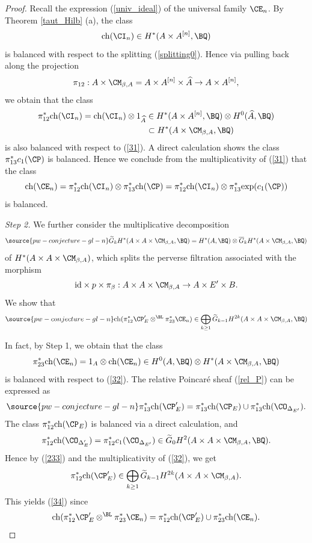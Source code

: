 \begin{proof}
Recall the expression (\ref{univ_ideal}) of the universal family $\CE_n$. By Theorem \ref{taut_Hilb} (a), the class
\[
\mathrm{ch}(\CI_n) \in  H^{\ast}(A\times A^{[n]}, \BQ)
\]
is balanced with respect to the splitting (\ref{splitting0}). Hence via pulling back along the projection
\[
\pi_{12}: A\times \CM_{\beta,A} = A\times A^{[n]} \times \widehat{A} \to A \times A^{[n]},
\]
we obtain that the class
\[
\begin{split}
\pi_{12}^\ast \mathrm{ch}(\CI_n) =  \mathrm{ch}(\CI_n) \otimes 1_{\widehat{A}} & \in H^\ast(A \times A^{[n]}, \BQ) \otimes H^0(\widehat{A}, \BQ)\\  & \subset H^*(A\times \CM_{\beta,A}, \BQ)
\end{split}
\]
is also balanced with respect to (\ref{31}). A direct calculation shows the class $\pi_{13}^\ast c_1(\CP)$ is balanced. Hence we conclude from the multiplicativity of (\ref{31}) that the class
\[
\mathrm{ch}(\CE_n) = \pi_{12}^\ast \mathrm{ch}(\CI_n) \otimes \pi_{13}^\ast \mathrm{ch}(\CP)=  \pi_{12}^\ast \mathrm{ch}(\CI_n) \otimes \pi_{13}^\ast \mathrm{exp}(c_1(\CP))
\]
is balanced.


 \emph{Step 2.} We further consider the multiplicative decomposition
\begin{equation}\label{32}
\source{pw-conjecture-gl-n}
\widetilde{G}_k H^*(A \times A \times \CM_{\beta, A}, \BQ) = H^*(A, \BQ) \otimes \overline{G}_k H^*(A \times \CM_{\beta, A}, \BQ)
\end{equation}
of $H^*(A \times A \times \CM_{\beta, A})$, which splits the perverse filtration associated with the morphism
\[
\mathrm{id} \times p \times \pi_\beta: A \times A \times \CM_{\beta, A} \to A \times E'\times B.
\]
We show that
\begin{equation}\label{34}
\source{pw-conjecture-gl-n}
\mathrm{ch}(\pi_{12}^\ast {\CP'_{E}} \otimes^{\BL} \pi_{23}^\ast \CE_n) \in \bigoplus_{k\geq 1}\widetilde{G}_{k-1} H^{2k}(A \times A\times \CM_{\beta, A}, \BQ)
\end{equation}

In fact, by Step 1, we obtain that the class
\[
\pi_{23}^* \mathrm{ch}(\CE_n) = 1_A \otimes \mathrm{ch}(\CE_n) \in H^0(A, \BQ) \otimes H^*(A\times \CM_{\beta,A}, \BQ)
\]
is balanced with respect to (\ref{32}). The relative Poincar\'e sheaf (\ref{rel_P}) can be expressed as
\begin{equation}\label{233}
\source{pw-conjecture-gl-n}
\pi_{13}^\ast \mathrm{ch}(\CP'_E) = \pi_{13}^\ast \mathrm{ch}(\CP_E)\cup \pi_{13}^* \mathrm{ch}(\CO_{\Delta_{E'}}).
\end{equation}
The class $\pi_{12}^\ast \mathrm{ch}(\CP_E)$ is balanced via a direct calculation, and
\[
\pi_{12}^*\mathrm{ch}(\CO_{\Delta_E'}) = \pi_{12}^* c_1(\CO_{\Delta_{E'}}) \in \widetilde{G}_0 H^2(A\times A \times \CM_{\beta,A}, \BQ).
\]
Hence by (\ref{233}) and the multiplicativity of (\ref{32}), we get
\[
\pi_{12}^* \mathrm{ch}(\CP'_E)\in \bigoplus_{k\geq 1} \widetilde{G}_{k-1}H^{2k}(A\times A \times \CM_{\beta,A}).
\]
This yields (\ref{34}) since
\[
\mathrm{ch}(\pi_{12}^\ast {\CP'_{E}} \otimes^{\BL} \pi_{23}^\ast \CE_n) = \pi_{12}^*\mathrm{ch}(\CP'_E) \cup \pi_{23}^\ast \mathrm{ch}(\CE_n).
\]


\end{proof}
